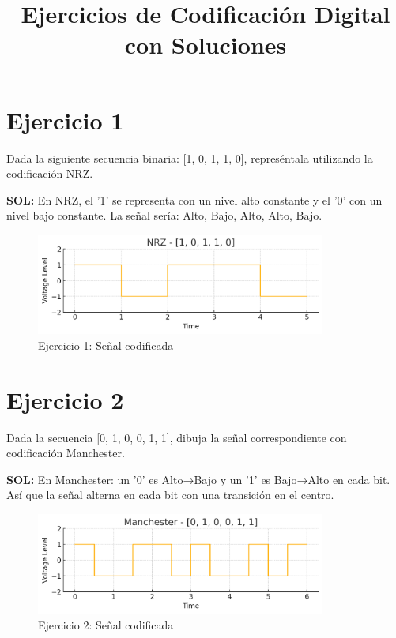 \documentclass[a4paper,12pt]{article}
\title{Ejercicios de Codificación Digital con Soluciones}
\author{}
\date{}
\begin{document}
\maketitle


\section*{Ejercicio 1}
Dada la siguiente secuencia binaria: [1, 0, 1, 1, 0], represéntala utilizando la codificación NRZ.



\textbf{SOL:} En NRZ, el '1' se representa con un nivel alto constante y el '0' con un nivel bajo constante. La señal sería: Alto, Bajo, Alto, Alto, Bajo.

\begin{figure}[h!]
\centering
\includegraphics[width=0.85\textwidth]{img/ejercicio_1.png}
\caption{Ejercicio 1: Señal codificada}
\end{figure}
\clearpage


\section*{Ejercicio 2}
Dada la secuencia [0, 1, 0, 0, 1, 1], dibuja la señal correspondiente con codificación Manchester.



\textbf{SOL:} En Manchester: un '0' es Alto→Bajo y un '1' es Bajo→Alto en cada bit. Así que la señal alterna en cada bit con una transición en el centro.

\begin{figure}[h!]
\centering
\includegraphics[width=0.85\textwidth]{img/ejercicio_2.png}
\caption{Ejercicio 2: Señal codificada}
\end{figure}
\clearpage
\end{document}
